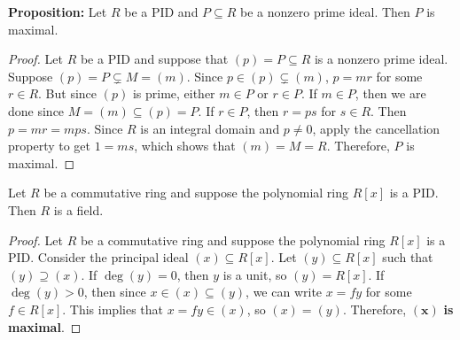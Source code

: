 \documentclass [12pt] {article}
\newenvironment{corollary}[1]{\begin{tcolorbox}[title={Corollary #1}]}{\end{tcolorbox}}
\renewcommand{\href}[2]{\hyperref[#1]{\bf{\underline{{#2}}}}}
\renewcommand{\bf}[1]{\textbf{{#1}}}
\begin{document}
\bf{Proposition:} Let $R$ be a PID and $P \subseteq R$ be a nonzero prime ideal. Then $P$ is
maximal.
\begin{proof}
    Let $R$ be a PID and suppose that $(p) = P \subseteq R$ is a nonzero prime ideal. Suppose
    $(p) = P \subsetneq M = (m)$. Since $p \in (p) \subsetneq (m)$, $p = mr$ for some $r \in R$.
    But since $(p)$ is prime, either $m \in P$ or $r \in P$. If $m \in P$, then we are done since
    $M = (m) \subseteq (p) = P$. If $r \in P$, then $r = ps$ for $s \in R$. Then
    $p = mr = mps$. Since $R$ is an integral domain and $p \neq 0$, apply the cancellation property
    to get $1 = ms$, which shows that $(m) = M = R$. Therefore, $P$ is maximal.
\end{proof}

\newpage
\begin{corollary}{}
    Let $R$ be a commutative ring and suppose the polynomial ring $R[x]$ is a PID. Then $R$ is a
    field.
\end{corollary}
\begin{proof}
    Let $R$ be a commutative ring and suppose the polynomial ring $R[x]$ is a PID. Consider the
    principal ideal $(x) \subseteq R[x]$. Let $(y) \subseteq R[x]$ such that $(y) \supseteq (x)$.
    If $\deg(y) = 0$, then $y$ is a unit, so $(y) = R[x]$. If $\deg(y) > 0$, then since
    $x \in (x) \subseteq (y)$, we can write $x = fy$ for some $f \in R[x]$. This implies that
    $x = fy \in (x)$, so $(x) = (y)$. Therefore, $\bm{(x)}$ \bf{is maximal}.
\end{proof}
\end{document}
